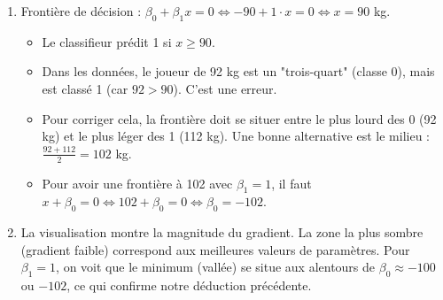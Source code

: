 \documentclass[solutions]{../exercices}
\begin{document}
\begin{solution}
\begin{enumerate}
        \item Frontière de décision : $\beta_0 + \beta_1 x = 0 \iff -90 + 1 \cdot x = 0 \iff x = 90$ kg.
        \begin{itemize}
            \item Le classifieur prédit 1 si $x \ge 90$.
            \item Dans les données, le joueur de 92 kg est un "trois-quart" (classe 0), mais est classé 1 (car $92 > 90$). C'est une erreur.
            \item Pour corriger cela, la frontière doit se situer entre le plus lourd des 0 (92 kg) et le plus léger des 1 (112 kg). Une bonne alternative est le milieu : $\frac{92 + 112}{2} = 102$ kg.
            \item Pour avoir une frontière à 102 avec $\beta_1 = 1$, il faut $x + \beta_0 = 0 \iff 102 + \beta_0 = 0 \iff \beta_0 = -102$.
        \end{itemize}

        \item La visualisation montre la magnitude du gradient. La zone la plus sombre (gradient faible) correspond aux meilleures valeurs de paramètres. Pour $\beta_1 = 1$, on voit que le minimum (vallée) se situe aux alentours de $\beta_0 \approx -100$ ou $-102$, ce qui confirme notre déduction précédente.
    \end{enumerate}
\end{solution}
\end{document}
